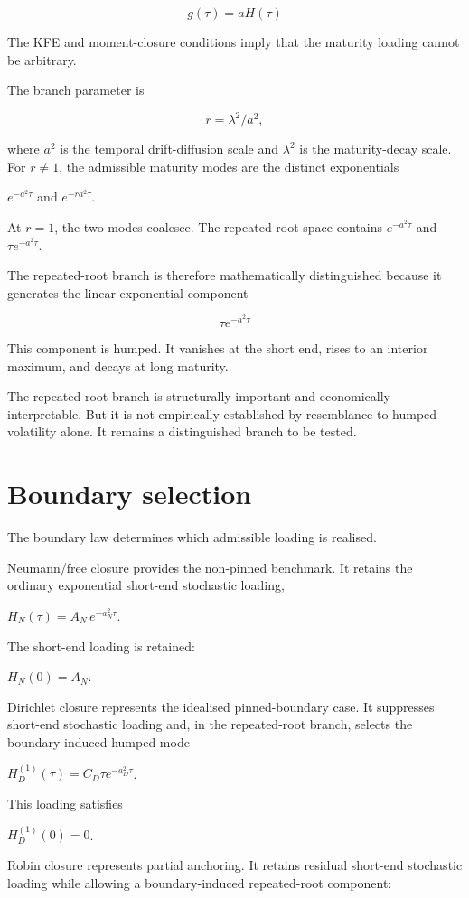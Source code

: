 \documentclass[11pt,oneside]{book}
\begin{document}
\[
g(\tau)=aH(\tau)
\]

The KFE and moment-closure conditions imply that the maturity loading
cannot be arbitrary.

The branch parameter is

\[
r = \lambda^2/a^2,
\]

where $a^2$ is the temporal drift-diffusion scale and $\lambda^2$ is the
maturity-decay scale. For $r\neq1$, the admissible maturity modes are the
distinct exponentials

$e^{-a^2\tau}$ and $e^{-ra^2\tau}$.

At $r=1$, the two modes coalesce. The repeated-root space contains $e^{-a^2\tau}$ and $\tau e^{-a^2\tau}$.

The repeated-root branch is therefore mathematically distinguished
because it generates the linear-exponential component

\[
\tau e^{-a^2\tau}
\]

This component is humped. It vanishes at the short end, rises to an
interior maximum, and decays at long maturity.

The repeated-root branch is structurally important and economically
interpretable. But it is not empirically established by resemblance to
humped volatility alone. It remains a distinguished branch to be tested.

\section{Boundary selection}\label{boundary-selection}

The boundary law determines which admissible loading is realised.

Neumann/free closure provides the non-pinned benchmark. It retains
the ordinary exponential short-end stochastic loading,

$H_N(\tau)=A_N\,e^{-a_N^2\tau}$.

The short-end loading is retained:

$H_N(0)=A_N$.

Dirichlet closure represents the idealised pinned-boundary case. It
suppresses short-end stochastic loading and, in the repeated-root
branch, selects the boundary-induced humped mode

$H_D^{(1)}(\tau)=C_D\tau e^{-a_D^2\tau}$.

This loading satisfies

$H_D^{(1)}(0)=0$.

Robin closure represents partial anchoring. It retains residual
short-end stochastic loading while allowing a boundary-induced
repeated-root component:
\end{document}
